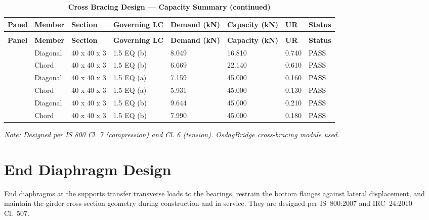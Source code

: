 \documentclass[12pt,a4paper]{report}
\numberwithin{table}{chapter}
\numberwithin{figure}{chapter}
\begin{document}
\vspace{1em}
\begin{longtable}{|C{2.0cm}|L{1.8cm}|C{2.2cm}|C{3.0cm}|C{1.8cm}|C{1.8cm}|C{1.2cm}|C{1.8cm}|}
\caption{\textbf{Cross Bracing Design --- Capacity Summary}}\\
\hline
\textbf{Panel} & \textbf{Member} & \textbf{Section} & \textbf{Governing LC} & \textbf{Demand (kN)} & \textbf{Capacity (kN)} & \textbf{UR} & \textbf{Status} \\[6pt]
\hline
\endfirsthead
\caption[]{\textbf{Cross Bracing Design --- Capacity Summary (continued)}}\\
\hline
\textbf{Panel} & \textbf{Member} & \textbf{Section} & \textbf{Governing LC} & \textbf{Demand (kN)} & \textbf{Capacity (kN)} & \textbf{UR} & \textbf{Status} \\[6pt]
\hline
\endhead
\hline
\endfoot
\endlastfoot
{} & Diagonal & 40 x 40 x 3 & 1.5 EQ (b) & 8.049 & 16.810 & 0.740 & \textcolor{black}{PASS} \\[6pt]
 & Chord & 40 x 40 x 3 & 1.5 EQ (b) & 6.669 & 22.140 & 0.610 & \textcolor{black}{PASS} \\[6pt]
\hline
{} & Diagonal & 40 x 40 x 3 & 1.5 EQ (a) & 7.159 & 45.000 & 0.160 & \textcolor{black}{PASS} \\[6pt]
 & Chord & 40 x 40 x 3 & 1.5 EQ (a) & 5.931 & 45.000 & 0.130 & \textcolor{black}{PASS} \\[6pt]
\hline
{} & Diagonal & 40 x 40 x 3 & 1.5 EQ (b) & 9.644 & 45.000 & 0.210 & \textcolor{black}{PASS} \\[6pt]
 & Chord & 40 x 40 x 3 & 1.5 EQ (b) & 7.990 & 45.000 & 0.180 & \textcolor{black}{PASS} \\[6pt]
\hline
\end{longtable}
\noindent\textit{Note: Designed per IS 800 Cl. 7 (compression) and Cl. 6 (tension). OsdagBridge cross-bracing module used.}

\section{End Diaphragm Design}
\label{sec:end-diaphragm}

End diaphragms at the supports transfer transverse loads to the bearings, restrain the bottom flanges against lateral displacement, and maintain the girder cross-section geometry during construction and in service. They are designed per IS~800:2007 and IRC~24:2010 Cl.~507.
\end{document}
